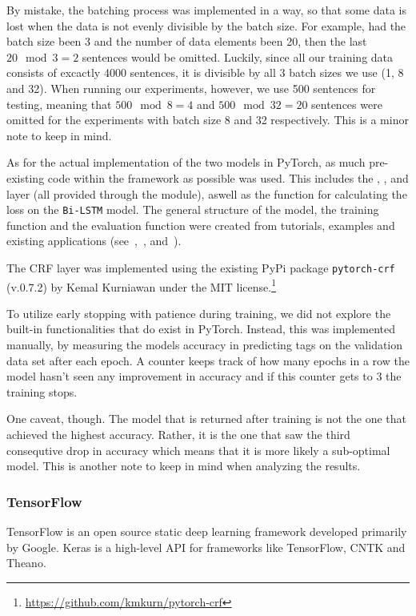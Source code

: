 By mistake, the batching process was implemented in a way, so that some data is
lost when the data is not evenly divisible by the batch size. For example, had
the batch size been 3 and the number of data elements been 20, then the last
$20\mod3 = 2$ sentences would be omitted. Luckily, since all our training data
consists of excactly 4000 sentences, it is divisible by all 3 batch sizes we use
(1, 8 and 32). When running our experiments, however, we use 500 sentences for
testing, meaning that $500\mod8 = 4$ and $500\mod32 = 20$ sentences were omitted
for the experiments with batch size 8 and 32 respectively. This is a minor note
to keep in mind.

As for the actual implementation of the two models in PyTorch, as much
pre-existing code within the framework as possible was used. This includes the
, ,  and  layer (all
provided through the  module), aswell as the
 function for calculating the loss on the
\texttt{Bi-LSTM} model. The general structure of the model, the training
function and the evaluation function were created from tutorials, examples and
existing applications (see~\cite{pytorch2017lstm},~\cite{yang2018ncrf},
and~\cite{pytorch2018examples}).

The CRF layer was implemented using the existing PyPi package
\texttt{pytorch-crf} (v.0.7.2) by Kemal Kurniawan under the MIT
license.\footnote{\url{https://github.com/kmkurn/pytorch-crf}}

To utilize early stopping with patience during training, we did not explore the
built-in functionalities that do exist in PyTorch. Instead, this was implemented
manually, by measuring the models accuracy in predicting tags on the validation
data set after each epoch. A counter keeps track of how many epochs in a row the
model hasn't seen any improvement in accuracy and if this counter gets to 3 the
training stops.

One caveat, though. The model that is returned after training is not the one
that achieved the highest accuracy. Rather, it is the one that saw the third
consequtive drop in accuracy which means that it is more likely a sub-optimal
model. This is another note to keep in mind when analyzing the results.


\subsubsection*{TensorFlow}
TensorFlow is an open source static deep learning framework developed primarily
by Google. Keras is a high-level API for frameworks like TensorFlow, CNTK and
Theano.

